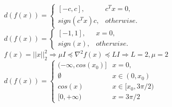 \documentclass{homework}
\begin{document}
\exercise*[4]
$d(f(x))=\begin{cases} 
      [-c, c],& c^Tx = 0, \\
      sign(c^Tx)c, & otherwise.
\end{cases}$
\exercise*[5]
$d(f(x))=\begin{cases} 
      [-1, 1],& x = 0, \\
      sign(x), & otherwise.
\end{cases}$
\exercise*[6]
$f(x) = ||x||_2^2 \Rightarrow \mu I\preceq\nabla^2f(x) \preceq LI\Rightarrow L=2, \mu=2$
\exercise*[3 addition]
$d(f(x))=\begin{cases} 
      (-\infty,cos(x_0)] & x = 0, \\
      \emptyset & x \in (0, x_0) \\
      cos(x) & x \in [x_0,3\pi/2) \\
      [0, +\infty) & x =3\pi/2
\end{cases}$
\end{document}
